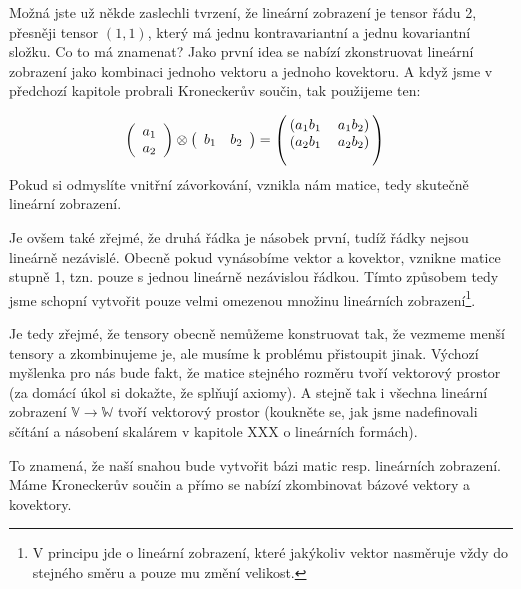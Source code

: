 \documentclass[a5paper,12pt]{amsbook}
\theoremstyle{definition}
\newcommand{\myspace}[1]{\mathbb{#1}}
\begin{document}
Možná jste už někde zaslechli tvrzení, že lineární zobrazení je tensor řádu 2, přesněji tensor $(1,1)$,
který má jednu kontravariantní a jednu kovariantní složku. Co to má znamenat? Jako první idea se nabízí
zkonstruovat lineární zobrazení jako kombinaci jednoho vektoru a jednoho kovektoru. A když jsme v
předchozí kapitole probrali Kroneckerův součin, tak použijeme ten:

\begin{equation*}
\begin{split}
& \left(\begin{array}{c} a_1 \\ a_2\end{array}\right)\otimes\left(\begin{array}{cc}b_1 & b_2\end{array}\right) =
\left(\begin{blockarray}{cc}
\begin{block}{(cc)}
a_1 b_1 & a_1 b_2 \\
\end{block}
\begin{block}{(cc)}
a_2 b_1 & a_2 b_2 \\
\end{block}
\end{blockarray}\right)
\end{split}
\end{equation*}
Pokud si odmyslíte vnitřní závorkování, vznikla nám matice, tedy skutečně lineární zobrazení.

Je ovšem také zřejmé, že druhá řádka je násobek první, tudíž řádky nejsou lineárně nezávislé. Obecně
pokud vynásobíme vektor a kovektor, vznikne matice stupně 1, tzn. pouze s jednou lineárně nezávislou
řádkou. Tímto způsobem tedy jsme schopní vytvořit pouze velmi omezenou množinu lineárních
zobrazení\footnote{
    V principu jde o lineární zobrazení, které jakýkoliv vektor nasměruje vždy do stejného
    směru a pouze mu změní velikost.
}.

Je tedy zřejmé, že tensory obecně nemůžeme konstruovat tak, že vezmeme menší tensory a zkombinujeme
je, ale musíme k problému přistoupit jinak. Výchozí myšlenka pro nás bude fakt, že matice stejného
rozměru tvoří vektorový prostor (za domácí úkol si dokažte, že splňují axiomy). A stejně tak
i všechna lineární zobrazení $\myspace{V}\rightarrow\myspace{W}$ tvoří vektorový prostor
(koukněte se, jak jsme nadefinovali sčítání a násobení skalárem v kapitole XXX o lineárních
formách).

To znamená, že naší snahou bude vytvořit bázi matic resp. lineárních zobrazení. Máme Kroneckerův
součin a přímo se nabízí zkombinovat bázové vektory a kovektory.
\end{document}
